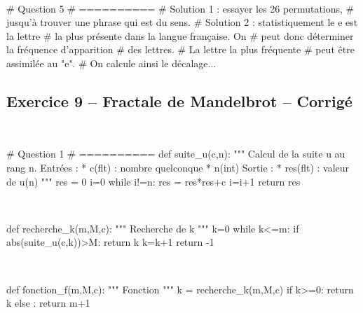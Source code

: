 \documentclass[10pt,fleqn]{article} %
\begin{document}
\begin{corrige}
$\quad$
\begin{python}
# Question 5
# ==========
# Solution 1 : essayer les 26 permutations, 
# jusqu'à trouver une phrase qui est du sens.
# Solution 2 : statistiquement le e est la lettre
# la plus présente dans la langue française. On
# peut donc déterminer la fréquence d'apparition 
# des lettres. # La lettre la plus fréquente 
# peut être assimilée au "e".
# On calcule ainsi le décalage...
\end{python}
\end{corrige}

\subsection*{Exercice 9 -- Fractale de Mandelbrot -- Corrigé}
\begin{corrige}
$\quad$
\begin{python}
# Question 1 
# ==========
def suite_u(c,n):
    """
    Calcul de la suite u au rang n.
    Entrées : 
     * c(flt) : nombre quelconque
     * n(int)
    Sortie : 
     * res(flt) : valeur de u(n)
    """
    res = 0
    i=0
    while i!=n:
        res = res*res+c
        i=i+1
    return res
\end{python}
\end{corrige}

\begin{corrige}
$\quad$
\begin{python}
def recherche_k(m,M,c):
    """ Recherche de k """
    k=0
    while k<=m:
        if abs(suite_u(c,k))>M:
            return k
        k=k+1
    return -1
\end{python}
\end{corrige}

\begin{corrige}
$\quad$
\begin{python}
def fonction_f(m,M,c):
    """ Fonction """
    k = recherche_k(m,M,c)
    if k>=0:
        return k
    else :
        return m+1
\end{python}
\end{corrige}
\end{document}
